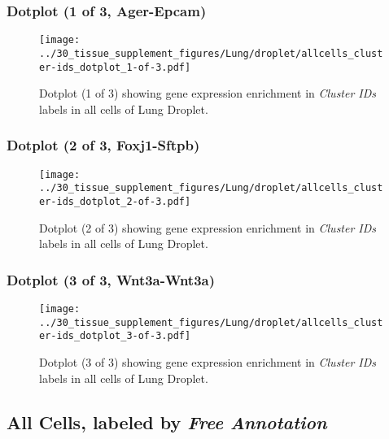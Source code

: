 \clearpage

\subsubsection{Dotplot (1 of 3, Ager-Epcam)}
\begin{figure}[h]
\centering
\texttt{[image: ../30\_tissue\_supplement\_figures/Lung/droplet/allcells\_cluster-ids\_dotplot\_1-of-3.pdf]}

\caption{ Dotplot (1 of 3)  showing gene expression enrichment in \emph{Cluster IDs} labels in all cells of Lung Droplet. }
\end{figure}


\clearpage

\subsubsection{Dotplot (2 of 3, Foxj1-Sftpb)}
\begin{figure}[h]
\centering
\texttt{[image: ../30\_tissue\_supplement\_figures/Lung/droplet/allcells\_cluster-ids\_dotplot\_2-of-3.pdf]}

\caption{ Dotplot (2 of 3)  showing gene expression enrichment in \emph{Cluster IDs} labels in all cells of Lung Droplet. }
\end{figure}


\clearpage

\subsubsection{Dotplot (3 of 3, Wnt3a-Wnt3a)}
\begin{figure}[h]
\centering
\texttt{[image: ../30\_tissue\_supplement\_figures/Lung/droplet/allcells\_cluster-ids\_dotplot\_3-of-3.pdf]}

\caption{ Dotplot (3 of 3)  showing gene expression enrichment in \emph{Cluster IDs} labels in all cells of Lung Droplet. }
\end{figure}


\clearpage

\subsection{All Cells, labeled by \emph{Free Annotation}}
